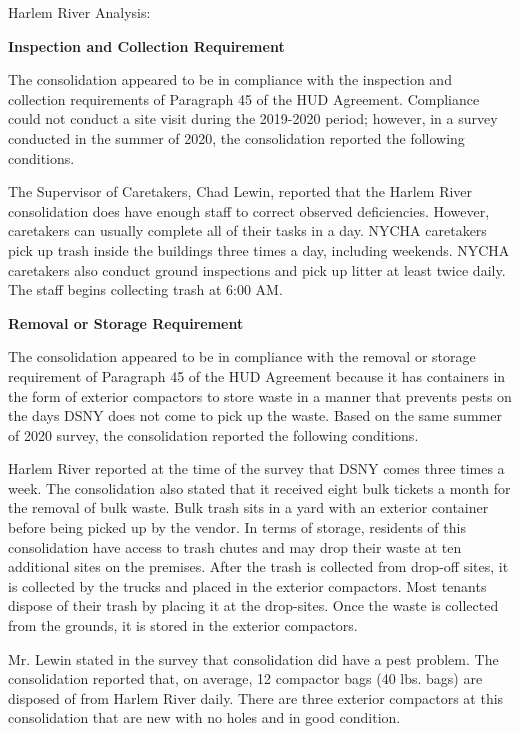 Harlem River Analysis: 

\textbf{Inspection and Collection Requirement} 

 

The consolidation appeared to be in compliance with the inspection and collection requirements of Paragraph 45 of the HUD Agreement. Compliance could not conduct a site visit during the 2019-2020 period; however, in a survey conducted in the summer of 2020, the consolidation reported the following conditions.

The Supervisor of Caretakers, Chad Lewin, reported that the Harlem River consolidation does have enough staff to correct observed deficiencies. However, caretakers can usually complete all of their tasks in a day. NYCHA caretakers pick up trash inside the buildings three times a day, including weekends. NYCHA caretakers also conduct ground inspections and pick up litter at least twice daily. The staff begins collecting trash at 6:00 AM.

\textbf{Removal or Storage Requirement} 

The consolidation appeared to be in compliance with the removal or storage requirement of Paragraph  45 of the HUD Agreement because it has containers in the form of exterior compactors to store waste in a manner that prevents pests on the days DSNY does not come to pick up the waste. Based on the same summer of  2020  survey, the consolidation reported the following conditions.

  

Harlem River reported at the time of the survey that DSNY comes three times a week. The consolidation also stated that it received eight bulk tickets a month for the removal of bulk waste. Bulk trash sits in a yard with an exterior container before being picked up by the vendor. In terms of storage, residents of this consolidation have access to trash chutes and may drop their waste at ten additional sites on the premises. After the trash is collected from drop-off sites, it is collected by the trucks and placed in the exterior compactors.  Most tenants dispose of their trash by placing it at the drop-sites. Once the waste is collected from the grounds, it is stored in the exterior compactors.  

 

Mr. Lewin stated in the survey that consolidation did have a pest problem. The consolidation reported that, on average, 12 compactor bags (40 lbs. bags)  are disposed of from Harlem River daily. There are three exterior compactors at this consolidation that are new with no holes and in good condition.

